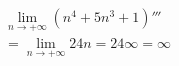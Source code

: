 
\begin{align}
    &\lim_{n \rightarrow +\infty}
    \left( n^4 + 5n^3 + 1 \right)''' \\
    &= \lim_{n \rightarrow +\infty} 24n 
    = 24\infty = \infty
\end{align}

\pagebreak
